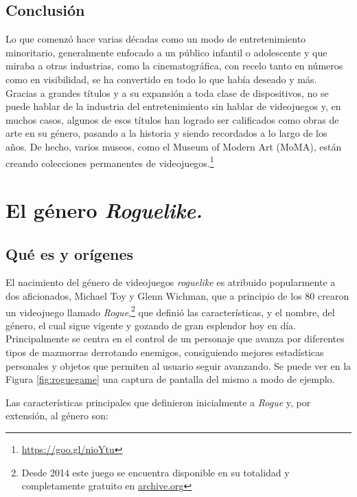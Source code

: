 \subsection{Conclusión}

Lo que comenzó hace varias décadas como un modo de entretenimiento minoritario, generalmente enfocado a un público infantil o adolescente y que miraba a otras industrias, como la cinematográfica, con recelo tanto en números como en visibilidad, se ha convertido en todo lo que había deseado y más. Gracias a grandes títulos y a su expansión a toda clase de dispositivos, no se puede hablar de la industria del entretenimiento sin hablar de videojuegos y, en muchos casos, algunos de esos títulos han logrado ser calificados como obras de arte en su género, pasando a la historia y siendo recordados a lo largo de los años.
De hecho, varios museos, como el Museum of Modern Art (MoMA), están creando colecciones permanentes de videojuegos.\footnote{\url{https://goo.gl/nioYtu}}

\section{El género \textit{Roguelike.}}
\label{sec:roguelikeinformacion}

\subsection{Qué es y orígenes}
\label{game:roguelikeis}

El nacimiento del género de videojuegos \textit{roguelike} es atribuido popularmente a dos aficionados, Michael Toy y Glenn Wichman, que a principio de los 80 crearon un videojuego llamado \textit{Rogue},\footnote{Desde 2014 este juego se encuentra disponible en su totalidad y completamente gratuito en \href{https://archive.org/details/msdos_Rogue_1983}{archive.org}} que definió las características, y el nombre, del género, el cual sigue vigente y gozando de gran esplendor hoy en día.\cite{Craddock2015a}\cite[Capítulo~3]{Barton2008a} Principalmente se centra en el control de un personaje que avanza por diferentes tipos de mazmorras derrotando enemigos, consiguiendo mejores estadísticas personales y objetos que permiten al usuario seguir avanzando. Se puede ver en la Figura \ref{fig:roguegame} una captura de pantalla del mismo a modo de ejemplo.

Las características principales que definieron inicialmente a \textit{Rogue} y, por extensión, al género son:

